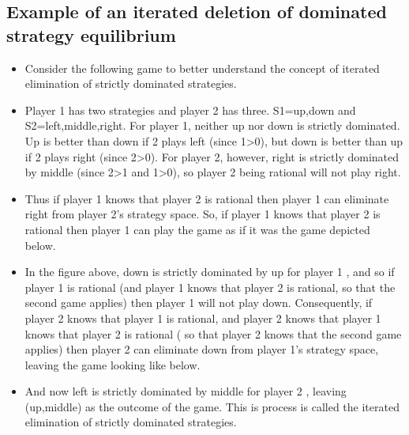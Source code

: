 \documentclass[a4paper,12pt]{article}
\begin{document}
\subsection{Example of an iterated deletion of dominated strategy equilibrium}
\begin{itemize}
\item Consider the following game to better understand the concept of iterated elimination of strictly dominated strategies.
\item Player 1 has two strategies and player 2 has three. S1={up,down} and S2={left,middle,right}. For player 1, neither up nor down is strictly dominated. Up is better than down if 2 plays left (since 1>0), but down is better than up if 2 plays right (since 2>0). For player 2, however, right is strictly dominated by middle (since 2>1 and 1>0), so player 2 being rational will not play right.

\item Thus if player 1 knows that player 2 is rational then player 1 can eliminate right from player 2's strategy space. So, if player 1 knows that player 2 is rational then player 1 can play the game as if it was the game depicted below.

\item In the figure above, down is strictly dominated by up for player 1 , and so if player 1 is rational (and player 1 knows that player 2 is rational, so that the second game applies) then player 1 will not play down. Consequently, if player 2 knows that player 1 is rational, and player 2 knows that player 1 knows that player 2 is rational ( so that player 2 knows that the second game applies) then player 2 can eliminate down from player 1's strategy space, leaving the game looking like below.

\item 
And now left is strictly dominated by middle for player 2 , leaving (up,middle) as the outcome of the game. This is process is called the iterated elimination of strictly dominated strategies.
\end{itemize}
\end{document}
